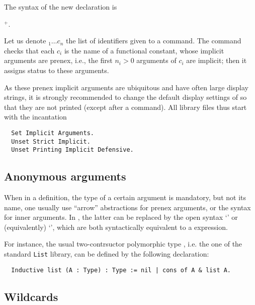 The syntax of the new declaration is

\begin{center}
 $^+$.
\end{center}

Let us denote $_1 \dots c_n$ the list of identifiers given to a
 command.
The command checks that each $c_i$ is the name of a functional
constant, whose implicit arguments are prenex, i.e., the first $n_i >
0$ arguments of $c_i$ are implicit; then it assigns
 status to these arguments.

As these prenex implicit arguments are ubiquitous and have often large
display strings, it is strongly recommended to change the default
display settings of \Coq{} so that they are not printed (except after a
 command).
All \ssr{} library files thus start with the incantation
\begin{lstlisting}
  Set Implicit Arguments.
  Unset Strict Implicit.
  Unset Printing Implicit Defensive.
\end{lstlisting}

\subsection{Anonymous arguments}

When in a definition, the type of a certain argument is mandatory, but
not its name, one usually use ``arrow'' abstractions for prenex
arguments, or the \ssrC{(_ : }{\term}\ssrC{)} syntax for inner arguments.
In \ssr{}, the latter can be replaced by the open syntax `'
or (equivalently)  `\ssrC{& }{\term}', which are both syntactically
equivalent to a \ssrC{(_ : }{\term}\ssrC{)} expression.

For instance, the usual two-contrsuctor polymorphic type ,
i.e. the one of the
standard {\tt List} library, can be defined by the following
declaration:
\begin{lstlisting}
  Inductive list (A : Type) : Type := nil | cons of A & list A.
\end{lstlisting}

\subsection{Wildcards}\label{ssec:wild}

